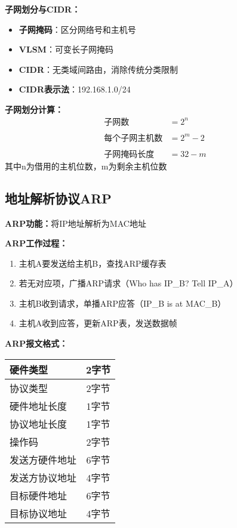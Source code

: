 \documentclass[lang=cn,newtx,10pt,scheme=chinese]{../../elegantbook}
\begin{document}
\textbf{子网划分与CIDR：}
\begin{itemize}
  \item \textbf{子网掩码}：区分网络号和主机号
  \item \textbf{VLSM}：可变长子网掩码
  \item \textbf{CIDR}：无类域间路由，消除传统分类限制
  \item \textbf{CIDR表示法}：192.168.1.0/24
\end{itemize}

\textbf{子网划分计算：}
\begin{align}
\text{子网数} &= 2^n \\\\
\text{每个子网主机数} &= 2^m - 2 \\\\
\text{子网掩码长度} &= 32 - m
\end{align}
其中n为借用的主机位数，m为剩余主机位数

\subsection{地址解析协议ARP}

\textbf{ARP功能：}将IP地址解析为MAC地址

\textbf{ARP工作过程：}
\begin{enumerate}
  \item 主机A要发送给主机B，查找ARP缓存表
  \item 若无对应项，广播ARP请求（Who has IP\_B? Tell IP\_A）
  \item 主机B收到请求，单播ARP应答（IP\_B is at MAC\_B）
  \item 主机A收到应答，更新ARP表，发送数据帧
\end{enumerate}

\textbf{ARP报文格式：}
\begin{center}
\begin{tabular}{|l|c|}
\hline
硬件类型 & 2字节 \\
\hline
协议类型 & 2字节 \\
\hline
硬件地址长度 & 1字节 \\
\hline
协议地址长度 & 1字节 \\
\hline
操作码 & 2字节 \\
\hline
发送方硬件地址 & 6字节 \\
\hline
发送方协议地址 & 4字节 \\
\hline
目标硬件地址 & 6字节 \\
\hline
目标协议地址 & 4字节 \\
\hline
\end{tabular}
\end{center}
\end{document}
